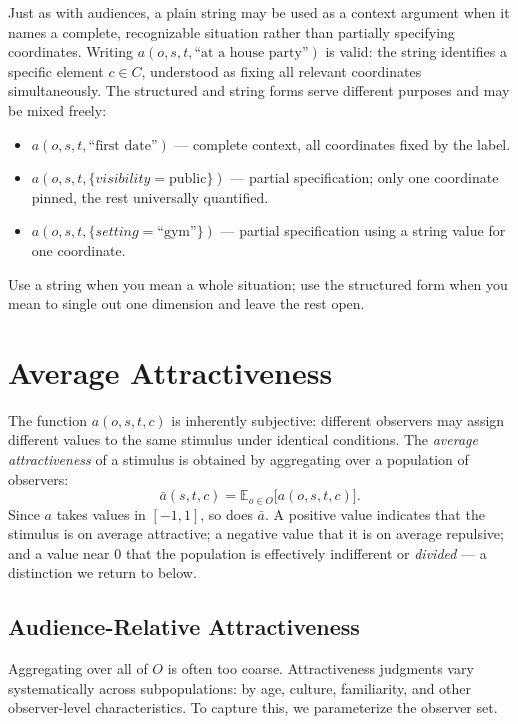 \begin{remark}
Just as with audiences, a plain string may be used as a context argument when it names a complete, recognizable situation rather than partially specifying coordinates.
Writing $a(o, s, t, \text{``at a house party''})$ is valid: the string identifies a specific element $c \in C$, understood as fixing all relevant coordinates simultaneously.
The structured and string forms serve different purposes and may be mixed freely:
\begin{itemize}
  \item $a(o, s, t, \text{``first date''})$ --- complete context, all coordinates fixed by the label.
  \item $a(o, s, t, \{\textit{visibility} = \text{public}\})$ --- partial specification; only one coordinate pinned, the rest universally quantified.
  \item $a(o, s, t, \{\textit{setting} = \text{``gym''}\})$ --- partial specification using a string value for one coordinate.
\end{itemize}
Use a string when you mean a whole situation; use the structured form when you mean to single out one dimension and leave the rest open.
\end{remark}

\section{Average Attractiveness}

The function $a(o, s, t, c)$ is inherently subjective: different observers may assign different values to the same stimulus under identical conditions.
The \emph{average attractiveness} of a stimulus is obtained by aggregating over a population of observers:
\[
  \bar{a}(s, t, c) = \mathbb{E}_{o \in O}\bigl[a(o, s, t, c)\bigr].
\]
Since $a$ takes values in $[-1,1]$, so does $\bar{a}$.
A positive value indicates that the stimulus is on average attractive; a negative value that it is on average repulsive; and a value near $0$ that the population is effectively indifferent or \emph{divided} --- a distinction we return to below.

\subsection{Audience-Relative Attractiveness}

Aggregating over all of $O$ is often too coarse.
Attractiveness judgments vary systematically across subpopulations: by age, culture, familiarity, and other observer-level characteristics.
To capture this, we parameterize the observer set.

